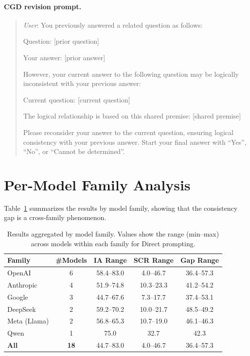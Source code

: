 \documentclass{article}
\newcommand{\method}{\textsc{CGD}}
\begin{document}
\paragraph{\method{} revision prompt.}
\begin{quote}
\small
\textit{User}: You previously answered a related question as follows:

Question: [prior question]

Your answer: [prior answer]

However, your current answer to the following question may be logically inconsistent with your previous answer:

Current question: [current question]

The logical relationship is based on this shared premise: [shared premise]

Please reconsider your answer to the current question, ensuring logical consistency with your previous answer. Start your final answer with ``Yes'', ``No'', or ``Cannot be determined''.
\end{quote}

\section{Per-Model Family Analysis}
\label{app:families}

Table~\ref{tab:families} summarizes the results by model family, showing that the consistency gap is a cross-family phenomenon.

\begin{table}[ht]
\caption{Results aggregated by model family. Values show the range (min--max) across models within each family for Direct prompting.}
\label{tab:families}
\begin{center}
\small
\begin{tabular}{l c c c c}
\toprule
\textbf{Family} & \textbf{\#Models} & \textbf{IA Range} & \textbf{SCR Range} & \textbf{Gap Range} \\
\midrule
OpenAI & 6 & 58.4--83.0 & 4.0--46.7 & 36.4--57.3 \\
Anthropic & 4 & 51.9--74.8 & 10.3--23.3 & 41.2--54.2 \\
Google & 3 & 44.7--67.6 & 7.3--17.7 & 37.4--53.1 \\
DeepSeek & 2 & 59.2--70.2 & 10.0--21.7 & 48.5--49.2 \\
Meta (Llama) & 2 & 56.8--65.3 & 10.7--19.0 & 46.1--46.3 \\
Qwen & 1 & 75.0 & 32.7 & 42.3 \\
\midrule
\textbf{All} & \textbf{18} & 44.7--83.0 & 4.0--46.7 & 36.4--57.3 \\
\bottomrule
\end{tabular}
\end{center}
\end{table}
\end{document}
